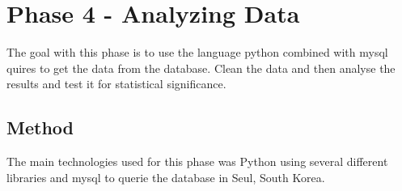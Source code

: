 
\chapter{Phase 4 - Analyzing Data} %

\label{Chapter7} %

The goal with this phase is to use the language python combined with mysql quires to get the data from the database. Clean the data and then analyse the results and test it for statistical significance.

\section{Method}
The main technologies used for this phase was Python using several different libraries and mysql to querie the database in Seul, South Korea.

